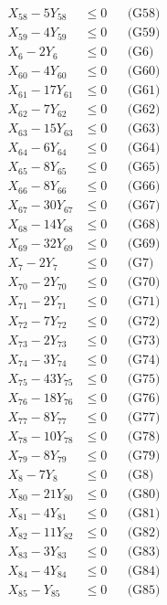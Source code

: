 \documentclass[a4paper,10pt]{article}
\begin{document}
{\begin{align}
X_{58} - 5Y_{58} &\leq 0 && \text{(G58)} \\
X_{59} - 4Y_{59} &\leq 0 && \text{(G59)} \\
X_{6} - 2Y_{6} &\leq 0 && \text{(G6)} \\
X_{60} - 4Y_{60} &\leq 0 && \text{(G60)} \\
X_{61} - 17Y_{61} &\leq 0 && \text{(G61)} \\
X_{62} - 7Y_{62} &\leq 0 && \text{(G62)} \\
X_{63} - 15Y_{63} &\leq 0 && \text{(G63)} \\
X_{64} - 6Y_{64} &\leq 0 && \text{(G64)} \\
X_{65} - 8Y_{65} &\leq 0 && \text{(G65)} \\
X_{66} - 8Y_{66} &\leq 0 && \text{(G66)} \\
\allowbreak
X_{67} - 30Y_{67} &\leq 0 && \text{(G67)} \\
X_{68} - 14Y_{68} &\leq 0 && \text{(G68)} \\
X_{69} - 32Y_{69} &\leq 0 && \text{(G69)} \\
X_{7} - 2Y_{7} &\leq 0 && \text{(G7)} \\
X_{70} - 2Y_{70} &\leq 0 && \text{(G70)} \\
X_{71} - 2Y_{71} &\leq 0 && \text{(G71)} \\
X_{72} - 7Y_{72} &\leq 0 && \text{(G72)} \\
X_{73} - 2Y_{73} &\leq 0 && \text{(G73)} \\
X_{74} - 3Y_{74} &\leq 0 && \text{(G74)} \\
X_{75} - 43Y_{75} &\leq 0 && \text{(G75)} \\
X_{76} - 18Y_{76} &\leq 0 && \text{(G76)} \\
X_{77} - 8Y_{77} &\leq 0 && \text{(G77)} \\
X_{78} - 10Y_{78} &\leq 0 && \text{(G78)} \\
X_{79} - 8Y_{79} &\leq 0 && \text{(G79)} \\
X_{8} - 7Y_{8} &\leq 0 && \text{(G8)} \\
X_{80} - 21Y_{80} &\leq 0 && \text{(G80)} \\
X_{81} - 4Y_{81} &\leq 0 && \text{(G81)} \\
X_{82} - 11Y_{82} &\leq 0 && \text{(G82)} \\
X_{83} - 3Y_{83} &\leq 0 && \text{(G83)} \\
X_{84} - 4Y_{84} &\leq 0 && \text{(G84)} \\
\allowbreak
X_{85} - Y_{85} &\leq 0 && \text{(G85)} \\

\end{align}}
\end{document}
